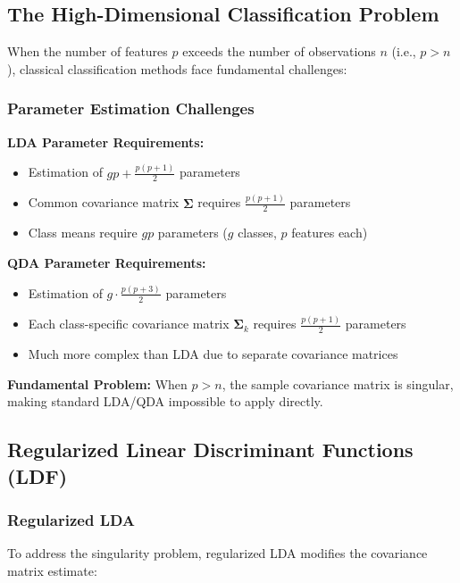 \documentclass[12pt,a4paper]{article}
\begin{document}
\subsection{The High-Dimensional Classification Problem}

When the number of features $p$ exceeds the number of observations $n$ (i.e., $p > n$), classical classification methods face fundamental challenges:

\subsubsection{Parameter Estimation Challenges}

\textbf{LDA Parameter Requirements:}
\begin{itemize}
    \item Estimation of $gp + \frac{p(p+1)}{2}$ parameters
    \item Common covariance matrix $\boldsymbol{\Sigma}$ requires $\frac{p(p+1)}{2}$ parameters
    \item Class means require $gp$ parameters ($g$ classes, $p$ features each)
\end{itemize}

\textbf{QDA Parameter Requirements:}
\begin{itemize}
    \item Estimation of $g \cdot \frac{p(p+3)}{2}$ parameters
    \item Each class-specific covariance matrix $\boldsymbol{\Sigma}_k$ requires $\frac{p(p+1)}{2}$ parameters
    \item Much more complex than LDA due to separate covariance matrices
\end{itemize}

\textbf{Fundamental Problem:} When $p > n$, the sample covariance matrix is singular, making standard LDA/QDA impossible to apply directly.

\subsection{Regularized Linear Discriminant Functions (LDF)}

\subsubsection{Regularized LDA}

To address the singularity problem, regularized LDA modifies the covariance matrix estimate:
\end{document}
